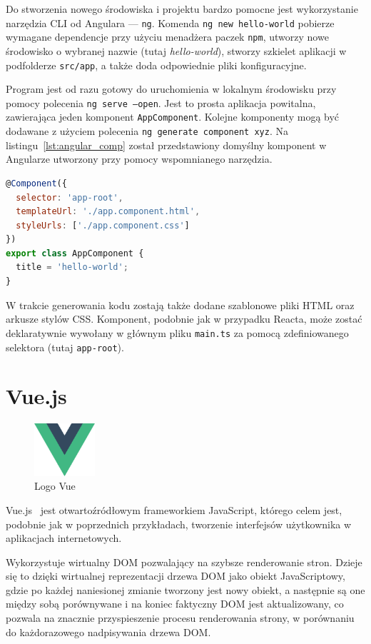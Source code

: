 \documentclass[twoside,a4paper]{report}
\begin{document}
Do stworzenia nowego środowiska i projektu bardzo pomocne jest wykorzystanie narzędzia CLI od Angulara --- \texttt{ng}.
Komenda \texttt{ng new hello-world} pobierze wymagane dependencje przy użyciu menadżera paczek \texttt{npm}, utworzy nowe środowisko o wybranej nazwie (tutaj \textit{hello-world}), stworzy szkielet aplikacji w podfolderze \texttt{src/app}, a także doda odpowiednie pliki konfiguracyjne.

Program jest od razu gotowy do uruchomienia w lokalnym środowisku przy pomocy polecenia \texttt{ng serve --open}.
Jest to prosta aplikacja powitalna, zawierająca jeden komponent \texttt{AppComponent}.
Kolejne komponenty mogą być dodawane z użyciem polecenia \texttt{ng generate component xyz}.
Na listingu~\ref{lst:angular_comp} został przedstawiony domyślny komponent w Angularze utworzony przy pomocy wspomnianego narzędzia.

\begin{lstlisting}[caption={Domyślny komponent w Angularze},label={lst:angular_comp},language=JavaScript]
@Component({
  selector: 'app-root',
  templateUrl: './app.component.html',
  styleUrls: ['./app.component.css']
})
export class AppComponent {
  title = 'hello-world';
}
\end{lstlisting}

W trakcie generowania kodu zostają także dodane szablonowe pliki HTML oraz arkusze stylów CSS\@.
Komponent, podobnie jak w przypadku Reacta, może zostać deklaratywnie wywołany w głównym pliku \texttt{main.ts} za pomocą zdefiniowanego selektora (tutaj \texttt{app-root}).

\section{Vue.js}
\begin{figure}
    \centering
    \includegraphics[width=0.2\textwidth]{img/logo_vue.png}
    \caption*{Logo Vue}\label{fig:logo_vue}
\end{figure}
Vue.js~\cite{vuejsdocs} jest otwartoźródłowym frameworkiem JavaScript, którego celem jest, podobnie jak w poprzednich przykładach, tworzenie interfejsów użytkownika w aplikacjach internetowych.

Wykorzystuje wirtualny DOM pozwalający na szybsze renderowanie stron.
Dzieje się to dzięki wirtualnej reprezentacji drzewa DOM jako obiekt JavaScriptowy, gdzie po każdej naniesionej zmianie tworzony jest nowy obiekt, a następnie są one między sobą porównywane i na koniec faktyczny DOM jest aktualizowany, co pozwala na znacznie przyspieszenie procesu renderowania strony, w porównaniu do każdorazowego nadpisywania drzewa DOM\@.
\end{document}
